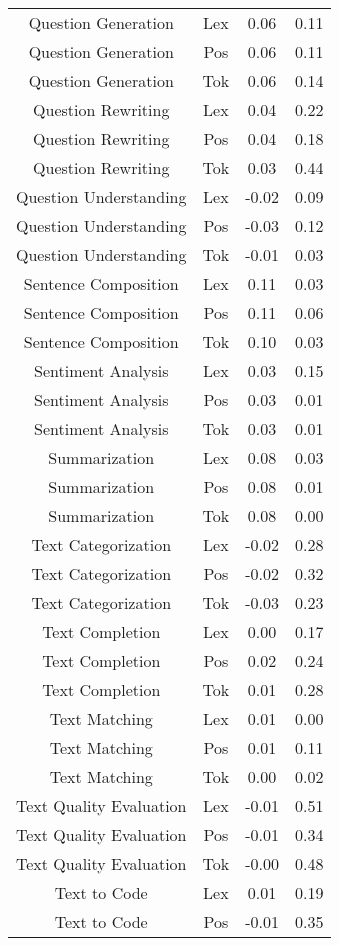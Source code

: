 \begin{table}
\begin{tabular}{cccc}
Question Generation & Lex & 0.06 & 0.11 \\
Question Generation & Pos & 0.06 & 0.11 \\
Question Generation & Tok & 0.06 & 0.14 \\
Question Rewriting & Lex & 0.04 & 0.22 \\
Question Rewriting & Pos & 0.04 & 0.18 \\
Question Rewriting & Tok & 0.03 & 0.44 \\
Question Understanding & Lex & -0.02 & 0.09 \\
Question Understanding & Pos & -0.03 & 0.12 \\
Question Understanding & Tok & -0.01 & 0.03 \\
Sentence Composition & Lex & 0.11 & 0.03 \\
Sentence Composition & Pos & 0.11 & 0.06 \\
Sentence Composition & Tok & 0.10 & 0.03 \\
Sentiment Analysis & Lex & 0.03 & 0.15 \\
Sentiment Analysis & Pos & 0.03 & 0.01 \\
Sentiment Analysis & Tok & 0.03 & 0.01 \\
Summarization & Lex & 0.08 & 0.03 \\
Summarization & Pos & 0.08 & 0.01 \\
Summarization & Tok & 0.08 & 0.00 \\
Text Categorization & Lex & -0.02 & 0.28 \\
Text Categorization & Pos & -0.02 & 0.32 \\
Text Categorization & Tok & -0.03 & 0.23 \\
Text Completion & Lex & 0.00 & 0.17 \\
Text Completion & Pos & 0.02 & 0.24 \\
Text Completion & Tok & 0.01 & 0.28 \\
Text Matching & Lex & 0.01 & 0.00 \\
Text Matching & Pos & 0.01 & 0.11 \\
Text Matching & Tok & 0.00 & 0.02 \\
Text Quality Evaluation & Lex & -0.01 & 0.51 \\
Text Quality Evaluation & Pos & -0.01 & 0.34 \\
Text Quality Evaluation & Tok & -0.00 & 0.48 \\
Text to Code & Lex & 0.01 & 0.19 \\
Text to Code & Pos & -0.01 & 0.35 \\

\end{tabular}
\end{table}
